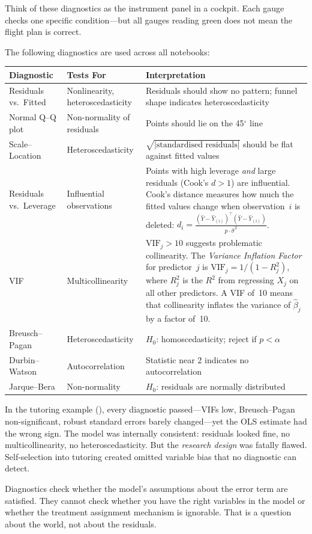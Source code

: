 \documentclass[11pt,a4paper]{article}
\theoremstyle{definition}
\theoremstyle{plain}
\theoremstyle{remark}
\newcommand{\bhat}{\hat{\beta}}
\begin{document}
Think of these diagnostics as the instrument panel in a cockpit. Each gauge checks one specific condition---but all gauges reading green does not mean the flight plan is correct.

The following diagnostics are used across all notebooks:

\begin{center}
\begin{tabular}{@{}llp{6.5cm}@{}}
\toprule
\textbf{Diagnostic} & \textbf{Tests For} & \textbf{Interpretation} \\
\midrule
Residuals vs.\ Fitted & Nonlinearity, heteroscedasticity & Residuals should show no pattern; funnel shape indicates heteroscedasticity \\
Normal Q--Q plot & Non-normality of residuals & Points should lie on the 45$^\circ$ line \\
Scale--Location & Heteroscedasticity & $\sqrt{|\text{standardised residuals}|}$ should be flat against fitted values \\
Residuals vs.\ Leverage & Influential observations & Points with high leverage \emph{and} large residuals (Cook's $d > 1$) are influential. Cook's distance measures how much the fitted values change when observation~$i$ is deleted: $d_i = \frac{(\hat{Y} - \hat{Y}_{(i)})^\top (\hat{Y} - \hat{Y}_{(i)})}{p \cdot \hat\sigma^2}$. \\
\midrule
VIF & Multicollinearity & $\text{VIF}_j > 10$ suggests problematic collinearity. The \emph{Variance Inflation Factor} for predictor~$j$ is $\text{VIF}_j = 1/(1 - R_j^2)$, where $R_j^2$ is the $R^2$ from regressing $X_j$ on all other predictors. A VIF of~10 means that collinearity inflates the variance of $\bhat_j$ by a factor of~10. \\
Breusch--Pagan & Heteroscedasticity & $H_0$: homoscedasticity; reject if $p < \alpha$ \\
Durbin--Watson & Autocorrelation & Statistic near 2 indicates no autocorrelation \\
Jarque--Bera & Non-normality & $H_0$: residuals are normally distributed \\
\bottomrule
\end{tabular}
\end{center}

\begin{warningbox}
In the tutoring example (), every diagnostic passed---VIFs low, Breusch--Pagan non-significant, robust standard errors barely changed---yet the OLS estimate had the wrong sign. The model was internally consistent: residuals looked fine, no multicollinearity, no heteroscedasticity. But the \emph{research design} was fatally flawed. Self-selection into tutoring created omitted variable bias that no diagnostic can detect.

Diagnostics check whether the model's assumptions about the error term are satisfied. They cannot check whether you have the right variables in the model or whether the treatment assignment mechanism is ignorable. That is a question about the world, not about the residuals.
\end{warningbox}
\end{document}

